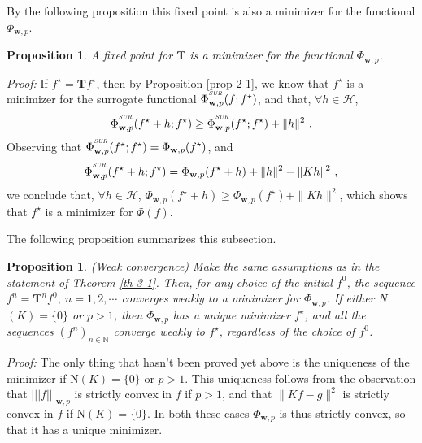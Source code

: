 \documentclass[10pt]{article}
\newtheorem{proposition}[theorem]{Proposition}
\newcommand{\QED}{\hfill \raisebox{-2pt}{\rule{5.6pt}{8pt}\rule{4pt}{0pt}}%
  \smallskip\par}
\def\N{\mathbb{N}}
\def\T{\mathbf{T}}
\def\cH{\mathcal{H}}
\def\mN{\mbox{N}}
\def\SUR{\mbox{\tiny{\it{SUR}}}}
\def\Vvert{\vert\!\vert\!\vert}
\begin{document}
By the following proposition this fixed point is also a minimizer
for the functional $\Phi_{\mathbf{w},p}$.
\begin{proposition}
\label{fix-min}
A fixed point for ${\T}$ is a minimizer for the functional
$\Phi_{\mathbf{w},p}$.
\end{proposition}
{\em Proof:}
If $f^\star = {\T} f^\star$, then by Proposition
\ref{prop-2-1}, we know that $f^\star$ is a minimizer for the surrogate
functional ${\Phi}^{^{\SUR}}_{\mathbf{w},p}(f ; f^\star)$, and
that, $\forall h \in \cH$,
\begin{equation*}
{\Phi}^{^{\SUR}}_{\mathbf{w},p}(f^\star + h ; f^\star) \geq
{\Phi}^{^{\SUR}}_{\mathbf{w},p}(f^\star ;f^\star) + \| h \|^2
~.
\end{equation*}
Observing that ${\Phi}^{^{\SUR}}_{\mathbf{w},p}(f^\star ; f^\star) =
\Phi_{\mathbf{w},p}(f^\star)$, and
\begin{equation*}
{\Phi}^{^{\SUR}}_{\mathbf{w},p}(f^\star + h ; f^\star) =
\Phi_{\mathbf{w},p}(f^\star + h) + \| h \|^2 - \| Kh\|^2 \ ,
\end{equation*}
we conclude that, $\forall h \in \cH$,
$ \Phi_{\mathbf{w},p}(f^\star + h) \geq \Phi_{\mathbf{w},p}(f^\star) + \|
Kh\|^2$, which shows that $f^\star$ is a minimizer for $\Phi(f)$.
\hfill\QED

\bigskip

The following proposition summarizes this subsection.
\begin{proposition}
\label{prop-wk-conv}
{\rm (Weak convergence)} Make the same assumptions as in the statement of
{\rm Theorem
\ref{th-3-1}}. Then, for
any choice of the initial $f^0$, the sequence $f^n={\T}^n f^0, \
n=1,2,\cdots$ converges weakly to a minimizer for $\Phi_{\mathbf{w},p}$.
If either {\rm N}$ (K)=\{0\}$ or $p>1$, then $\Phi_{\mathbf{w},p}$ has a unique
minimizer $f^\star$, and all the sequences $(f^n)_{n \in \N}$ converge
weakly to $f^\star$, regardless of the choice of $f^0$.
\end{proposition}
{\em Proof:}
The only thing that hasn't been proved yet above is the
uniqueness of the minimizer if $\mN (K)=\{0\}$ or $p>1$. This uniqueness
follows from the observation that $\Vvert f \Vvert_{\mathbf{w},p}$ is strictly
convex in $f$ if $p>1$, and that $\|Kf-g\|^2$ is strictly convex in
$f$ if $\mN (K)=\{0\}$. In both these cases $\Phi_{\mathbf{w},p}$ is thus
strictly convex, so that it has a unique minimizer. \hfill \QED

\bigskip
\end{document}
